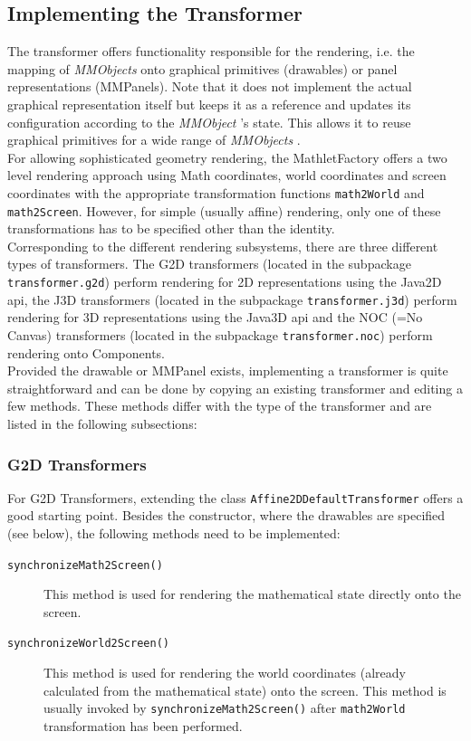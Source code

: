 \documentclass[a4paper,12pt]{book}
\newcommand{\mmo}{\emph{MMObject }}
\newcommand{\mmos}{\emph{MMObjects }}
\begin{document}
\subsection{Implementing the Transformer}
The transformer offers functionality responsible for the rendering, i.e. the mapping of \mmos onto graphical primitives 
(drawables) or panel representations (MMPanels). Note that it does not implement the actual graphical representation itself but keeps 
it as a reference and updates its configuration according to the \mmo's state. This allows it to reuse graphical primitives for 
a wide range of \mmos.\\
For allowing sophisticated geometry rendering, the MathletFactory offers a two level rendering approach using Math coordinates, world
coordinates and screen coordinates with the appropriate transformation functions {\tt math2World} and {\tt math2Screen}. However, for 
simple (usually affine) rendering, only one of these transformations has to be specified other than the identity.\\
Corresponding to the different rendering subsystems, there are three different types of transformers. The G2D transformers (located 
in the subpackage {\tt transformer.g2d}) perform rendering for 2D representations using the Java2D api, the J3D transformers (located 
in the subpackage {\tt transformer.j3d}) perform rendering for 3D representations using the Java3D api and the NOC (=No Canvas) 
transformers (located in the subpackage {\tt transformer.noc}) perform rendering onto Components.\\
Provided the drawable or MMPanel exists, implementing a transformer is quite straightforward and can be done by copying an existing
transformer and editing a few methods. These methods differ with the type of the transformer and are listed in the following
subsections:

\subsubsection{G2D Transformers}
For G2D Transformers, extending the class {\tt Affine2DDefaultTransformer} offers a good starting point. Besides the constructor, 
where the drawables are specified (see below), the following methods need to be implemented:
\begin{description}
\item[{\tt synchronizeMath2Screen()}] This method is used for rendering the mathematical state directly onto the screen.
 
\item[{\tt synchronizeWorld2Screen()}] This method is used for rendering the world coordinates (already calculated from the 
mathematical state) onto the screen. This method is usually invoked by {\tt synchronizeMath2Screen()} after {\tt math2World}
transformation has been performed.
\end{description}
\end{document}
